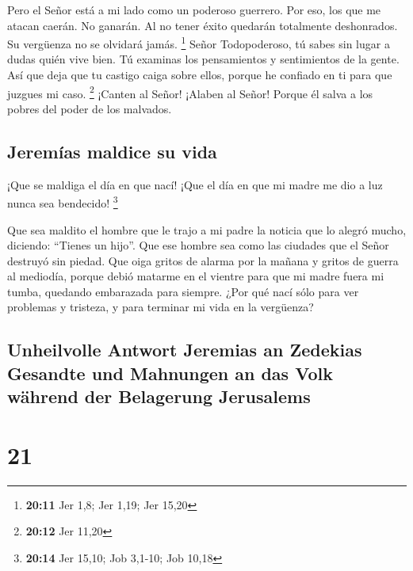 Pero el Señor está a mi lado como un poderoso guerrero.
Por eso, los que me atacan caerán. No ganarán. Al no tener éxito
quedarán totalmente deshonrados. Su vergüenza no se olvidará jamás.
\footnote{\textbf{20:11} Jer 1,8; Jer 1,19; Jer 15,20} 
Señor Todopoderoso, tú sabes sin lugar a dudas quién vive bien. Tú
examinas los pensamientos y sentimientos de la gente. Así que deja que
tu castigo caiga sobre ellos, porque he confiado en ti para que juzgues
mi caso. \footnote{\textbf{20:12} Jer 11,20}  ¡Canten al
Señor! ¡Alaben al Señor! Porque él salva a los pobres del poder de los
malvados.

\hypertarget{jeremuxedas-maldice-su-vida}{%
\subsection{Jeremías maldice su
vida}\label{jeremuxedas-maldice-su-vida}}

 ¡Que se maldiga el día en que nací! ¡Que el día en que
mi madre me dio a luz nunca sea bendecido! \footnote{\textbf{20:14} Jer
  15,10; Job 3,1-10; Job 10,18}

 Que sea maldito el hombre que le trajo a mi padre la
noticia que lo alegró mucho, diciendo: ``Tienes un hijo''.
 Que ese hombre sea como las ciudades que el Señor
destruyó sin piedad. Que oiga gritos de alarma por la mañana y gritos de
guerra al mediodía,  porque debió matarme en el vientre
para que mi madre fuera mi tumba, quedando embarazada para siempre.
 ¿Por qué nací sólo para ver problemas y tristeza, y para
terminar mi vida en la vergüenza?

\hypertarget{unheilvolle-antwort-jeremias-an-zedekias-gesandte-und-mahnungen-an-das-volk-wuxe4hrend-der-belagerung-jerusalems}{%
\subsection{Unheilvolle Antwort Jeremias an Zedekias Gesandte und
Mahnungen an das Volk während der Belagerung
Jerusalems}\label{unheilvolle-antwort-jeremias-an-zedekias-gesandte-und-mahnungen-an-das-volk-wuxe4hrend-der-belagerung-jerusalems}}

\hypertarget{section-20}{%
\section{21}\label{section-20}}

